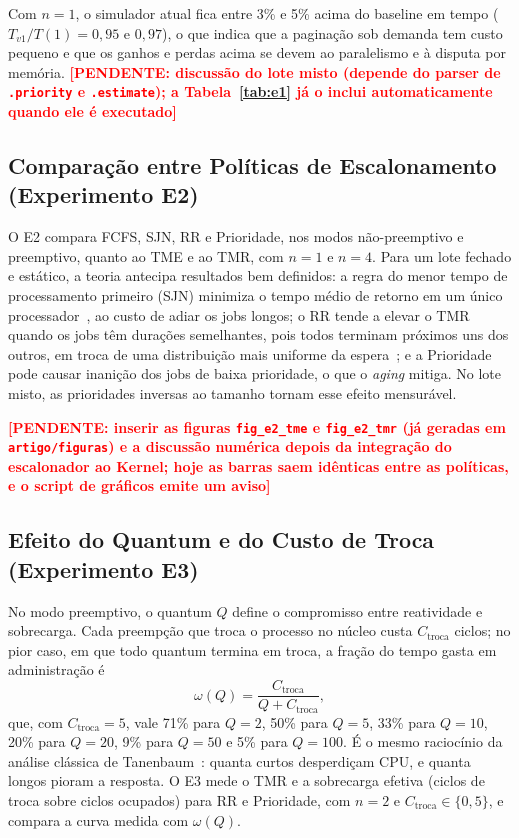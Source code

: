 \documentclass[conference]{IEEEtran}
\newcommand{\pendente}[1]{\textcolor{red}{\textbf{[PENDENTE: #1]}}}
\begin{document}
Com $n = 1$, o simulador atual fica entre 3\% e 5\% acima do baseline em tempo ($T_{v1}/T(1) = 0{,}95$ e $0{,}97$), o que indica que a paginação sob demanda tem custo pequeno e que os ganhos e perdas acima se devem ao paralelismo e à disputa por memória. \pendente{discussão do lote misto (depende do parser de \texttt{.priority} e \texttt{.estimate}); a Tabela~\ref{tab:e1} já o inclui automaticamente quando ele é executado}

\subsection{Comparação entre Políticas de Escalonamento (Experimento E2)}
O E2 compara FCFS, SJN, RR e Prioridade, nos modos não-preemptivo e preemptivo, quanto ao TME e ao TMR, com $n = 1$ e $n = 4$. Para um lote fechado e estático, a teoria antecipa resultados bem definidos: a regra do menor tempo de processamento primeiro (SJN) minimiza o tempo médio de retorno em um único processador~\cite{smith1956}, ao custo de adiar os jobs longos; o RR tende a elevar o TMR quando os jobs têm durações semelhantes, pois todos terminam próximos uns dos outros, em troca de uma distribuição mais uniforme da espera~\cite{silberschatz2018}; e a Prioridade pode causar inanição dos jobs de baixa prioridade, o que o \textit{aging} mitiga. No lote misto, as prioridades inversas ao tamanho tornam esse efeito mensurável.

\pendente{inserir as figuras \texttt{fig\_e2\_tme} e \texttt{fig\_e2\_tmr} (já geradas em \texttt{artigo/figuras}) e a discussão numérica depois da integração do escalonador ao Kernel; hoje as barras saem idênticas entre as políticas, e o script de gráficos emite um aviso}

\subsection{Efeito do Quantum e do Custo de Troca (Experimento E3)}
No modo preemptivo, o quantum $Q$ define o compromisso entre reatividade e sobrecarga. Cada preempção que troca o processo no núcleo custa $C_{\text{troca}}$ ciclos; no pior caso, em que todo quantum termina em troca, a fração do tempo gasta em administração é
\begin{equation}
\omega(Q) = \frac{C_{\text{troca}}}{Q + C_{\text{troca}}},
\end{equation}
que, com $C_{\text{troca}} = 5$, vale 71\% para $Q = 2$, 50\% para $Q = 5$, 33\% para $Q = 10$, 20\% para $Q = 20$, 9\% para $Q = 50$ e 5\% para $Q = 100$. É o mesmo raciocínio da análise clássica de Tanenbaum~\cite{tanenbaum2015}: quanta curtos desperdiçam CPU, e quanta longos pioram a resposta. O E3 mede o TMR e a sobrecarga efetiva (ciclos de troca sobre ciclos ocupados) para RR e Prioridade, com $n = 2$ e $C_{\text{troca}} \in \{0, 5\}$, e compara a curva medida com $\omega(Q)$.
\end{document}
